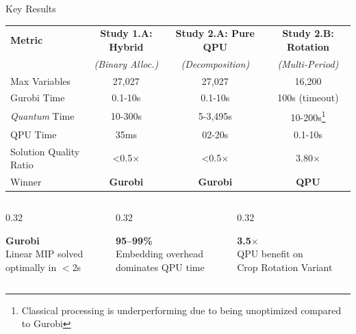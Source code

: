 \documentclass[aspectratio=169,10pt]{beamer}
\begin{document}
\begin{frame}{Key Results}
    
    \centering
\small
\vspace{-0.8cm}
\begin{tabular}{lccc}
\toprule
\textbf{Metric} & \textbf{Study 1.A: Hybrid} & \textbf{Study 2.A: Pure QPU} & \textbf{Study 2.B: Rotation} \\
& \textit{(Binary Alloc.)} & \textit{(Decomposition)} & \textit{(Multi-Period)} \\
\midrule
Max Variables & 27,027 & 27,027 & 16,200 \\
Gurobi Time & 0.1-10s & 0.1-10s & 100s (timeout) \\
\textit{Quantum} Time & 10-300s & 5-3,495s & 10-200s\footnote{Classical processing is underperforming due to being unoptimized compared to Gurobi} \\
QPU Time & 35ms & 02-20s & 0.1-10s \\
Solution Quality Ratio & <0.5$\times$ & <0.5$\times$ & 3.80$\times$ \\
Winner & \textcolor{accentGreen}{\textbf{Gurobi}} & \textcolor{accentGreen}{\textbf{Gurobi}} & \textcolor{primaryBlue}{\textbf{QPU}} \\
\bottomrule
\end{tabular}
\vspace{0.3cm}

\begin{columns}
\begin{column}{0.32\textwidth}
\centering
\begin{keybox}
\centering
\textcolor{accentGreen}{\Large\textbf{Gurobi}}\\
\scriptsize Linear MIP solved\\
\scriptsize optimally in $<$2s
\end{keybox}
\end{column}
\begin{column}{0.32\textwidth}
\centering
\begin{warnbox}
\centering
\textcolor{warmOrange}{\Large\textbf{95--99\%}}\\
\scriptsize Embedding overhead\\
\scriptsize dominates QPU time
\end{warnbox}
\end{column}
\begin{column}{0.32\textwidth}
\centering
\begin{resultbox}
\centering
\textcolor{accentTeal}{\Large\textbf{3.5$\times$}}\\
\scriptsize QPU benefit on\\
\scriptsize Crop Rotation Variant
\end{resultbox}
\end{column}
\end{columns}
\end{frame}
\end{document}
